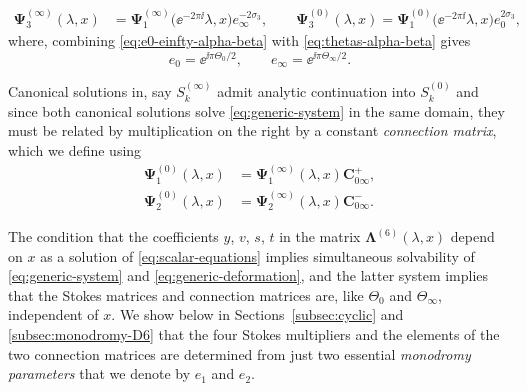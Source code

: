 \begin{align}%
\mathbf{\Psi}_3^{(\infty)}(\lambda, x) &= \mathbf{\Psi}_1^{(\infty)}\big(\ee^{-2\pi \ii} \lambda, x\big) e_\infty^{-2\sigma_3},
\qquad
\mathbf{\Psi}_3^{(0)}(\lambda, x) = \mathbf{\Psi}_1^{(0)}\big(\ee^{-2\pi \ii} \lambda, x\big) e_0^{2\sigma_3},\label{eq:stokes-condition-4}
\end{align}
where, combining \eqref{eq:e0-einfty-alpha-beta} with \eqref{eq:thetas-alpha-beta} gives
\begin{equation}
 e_0 = \ee^{\ii \pi \Theta_0/2},\qquad e_\infty = \ee^{\ii \pi \Theta_\infty/2}.
 \label{eq:e0-einfty}
\end{equation}

Canonical solutions in, say $S_k^{(\infty)}$ admit analytic continuation into $S_k^{(0)}$ and since both canonical solutions solve \eqref{eq:generic-system} in the same domain, they must be related by multiplication on the right by a constant \emph{connection matrix}, which we define using
\begin{align}
\label{eq:connection-matrix-1}\mathbf{\Psi}_1^{(0)}(\lambda, x) &= \mathbf{\Psi}_1^{(\infty)}(\lambda, x) \mathbf{C}_{0\infty}^+, \\
\label{eq:connection-matrix-2}\mathbf{\Psi}_2^{(0)}(\lambda, x) &= \mathbf{\Psi}_2^{(\infty)}(\lambda, x) \mathbf{C}_{0\infty}^-.
\end{align}

The condition that the coefficients $y$, $v$, $s$, $t$ in the matrix $\mathbf{\Lambda}^{(6)}(\lambda,x)$ depend on $x$ as a solution of \eqref{eq:scalar-equations} implies simultaneous solvability of \eqref{eq:generic-system} and \eqref{eq:generic-deformation}, and the latter system implies that the Stokes matrices and connection matrices are, like $\Theta_0$ and $\Theta_\infty$, independent of $x$. We show below in Sections~\ref{subsec:cyclic} and \ref{subsec:monodromy-D6} that the four Stokes multipliers and the elements of the two connection matrices are determined from just two essential \emph{monodromy parameters} that we denote by $e_1$ and $e_2$.


